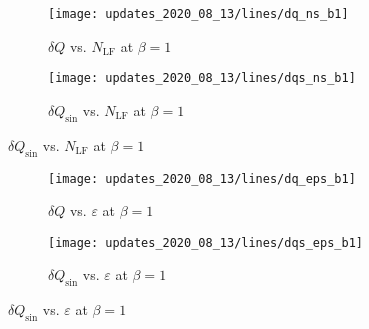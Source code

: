 \clearpage
\begin{figure}[h!]
  \centering
  \begin{subfigure}[htpb]{0.4725\textwidth}
    \texttt{[image: updates\_2020\_08\_13/lines/dq\_ns\_b1]}
    \caption{\(\delta Q\) vs. \(N_{\mathrm{LF}}\) at \(\beta = 1\)}%
  \end{subfigure}
  \begin{subfigure}[htpb]{0.4725\textwidth}
    \texttt{[image: updates\_2020\_08\_13/lines/dqs\_ns\_b1]}
    \caption{\(\delta Q_{\sin}\) vs. \(N_{\mathrm{LF}}\) at \(\beta = 1\)}%
  \end{subfigure}
\end{figure}
%
\begin{figure}[h!]
  \centering
  \begin{subfigure}[htpb]{0.4725\textwidth}
    \texttt{[image: updates\_2020\_08\_13/lines/dq\_eps\_b1]}
    \caption{\(\delta Q\) vs. \(\varepsilon\) at \(\beta = 1\)}%
  \end{subfigure}
  \begin{subfigure}[htpb]{0.4725\textwidth}
    \texttt{[image: updates\_2020\_08\_13/lines/dqs\_eps\_b1]}
    \caption{\(\delta Q_{\sin}\) vs. \(\varepsilon\) at \(\beta = 1\)}%
  \end{subfigure}
\end{figure}
%


